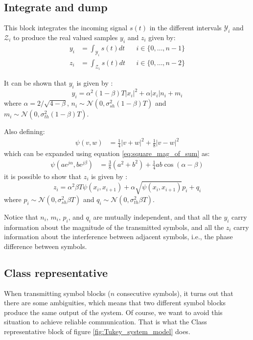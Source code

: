 \subsection{Integrate and dump}

This block integrates the incoming signal $s(t)$ in the different intervals $\mathcal{Y}_i$ and $\mathcal{Z}_i$ to produce the real valued samples $y_i$ and $z_i$ given by:
\begin{align}
	y_i&=\int_{\mathcal Y_i}s(t)dt&&i\in \{0,\dotsc,n-1\}\\
	z_i&=\int_{\mathcal Z_i}s(t)dt&&i\in \{0,\dotsc,n-2\}
\end{align}

It can be shown that $y_i$ is given by \cite{Tasbihi_Tukey}:
\begin{equation}
y_i=\alpha^2(1-\beta)T|x_i|^2+\alpha|x_i|n_i+m_i
	\label{eq:y_i_Tukey}
\end{equation}
where $\alpha=2/\sqrt{4-\beta}$, $n_i\sim\mathcal N(0,\sigma^2_{sh}(1-\beta)T)$ and $m_i\sim\mathcal N(0,\sigma^2_{th}(1-\beta)T)$.

Also defining:
\begin{align}
\psi(v,w)&=\frac{1}{4}|v+w|^2 + \frac{1}{8}|v-w|^2
\end{align}
which can be expanded using equation \ref{eq:square_mag_of_sum} as:
\begin{align}
\psi(ae^{j\alpha},be^{j\beta})&=\frac{3}{8}\left(a^2+b^2\right)+\frac{1}{4}ab\cos(\alpha-\beta)
\end{align}
 it is possible to show that $z_i$ is given by \cite{Tasbihi_Tukey}:
\begin{equation}
	z_i=\alpha^2\beta T\psi(x_i,x_{i+1})+\alpha\sqrt{\psi(x_i,x_{i+1})}p_i +q_i
	\label{eq:z_i_Tukey}
\end{equation}
where $p_i\sim\mathcal N(0,\sigma^2_{sh}\beta T)$ and $q_i\sim\mathcal N(0,\sigma^2_{th}\beta T)$.

Notice that $n_i$, $m_i$, $p_i$, and $q_i$ are mutually independent, and that all the $y_i$ carry information about the magnitude of the transmitted symbols, and all the $z_i$ carry information about the interference between adjacent symbols, i.e., the phase difference between symbols.

\subsection{Class representative}

When transmitting symbol blocks ($n$ consecutive symbols), it turns out that there are some ambiguities, which means that two different symbol blocks produce the same output of the system. Of course, we want to avoid this situation to achieve reliable communication. That is what the Class representative block of figure \ref{fig:Tukey_system_model} does.

